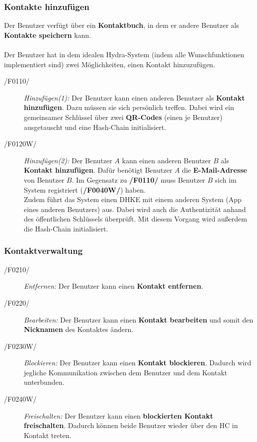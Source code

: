 \subsubsection{Kontakte hinzufügen}
Der Benutzer verfügt über ein \textbf{Kontaktbuch}, in dem er andere Benutzer als \textbf{Kontakte speichern} kann. \\
\\
Der Benutzer hat in dem idealen Hydra-System (indem alle Wunschfunktionen implementiert sind) zwei Möglichkeiten, einen Kontakt hinzuzufügen.
	\begin{description}
		\item[/F0110/]
			\textit{Hinzufügen(1):}
			Der Benutzer kann einen anderen Benutzer als \textbf{Kontakt hinzufügen}.
			Dazu müssen sie sich persönlich treffen. 		
			Dabei wird ein gemeinsamer Schlüssel über zwei \textbf{QR-Codes} (einen je Benutzer) ausgetauscht und eine Hash-Chain initialisiert.
		\item[/F0120W/]
		\textit{Hinzufügen(2):}
			Der Benutzer $A$ kann einen anderen Benutzer $B$ als \textbf{Kontakt hinzufügen}. 
			Dafür benötigt Benutzer $A$ die \textbf{E-Mail-Adresse} von Benutzer $B$.
			Im Gegensatz zu \textbf{/F0110/} muss Benutzer $B$ sich im System registriert (\textbf{/F0040W/}) haben.\\
		Zudem führt das System  einen \ac{DHKE} mit einem anderen System (App eines anderen Benutzers) aus. 
		Dabei wird auch die Authentizität anhand des öffentlichen Schlüssels überprüft. Mit diesem Vorgang wird außerdem die Hash-Chain initialisiert.
	\end{description}
	
\subsubsection{Kontaktverwaltung}
	\begin{description}
		\item[/F0210/]
			\textit{Entfernen:}
			Der Benutzer kann einen \textbf{Kontakt entfernen}.
		\item[/F0220/]
			\textit{Bearbeiten:}
			Der Benutzer kann einen \textbf{Kontakt bearbeiten} und somit den \textbf{Nicknamen} des Kontaktes ändern.
		\item[/F0230W/]
			\textit{Blockieren:}
				Der Benutzer kann einen \textbf{Kontakt blockieren}. 
				Dadurch wird jegliche Kommunikation zwischen dem Benutzer und dem Kontakt unterbunden.	
		\item[/F0240W/]
			\textit{Freischalten:} 
			Der Benutzer kann einen \textbf{blockierten Kontakt freischalten}.
			Dadurch können beide Benutzer wieder über den \ac{HC} in Kontakt treten.		
	\end{description}
	
